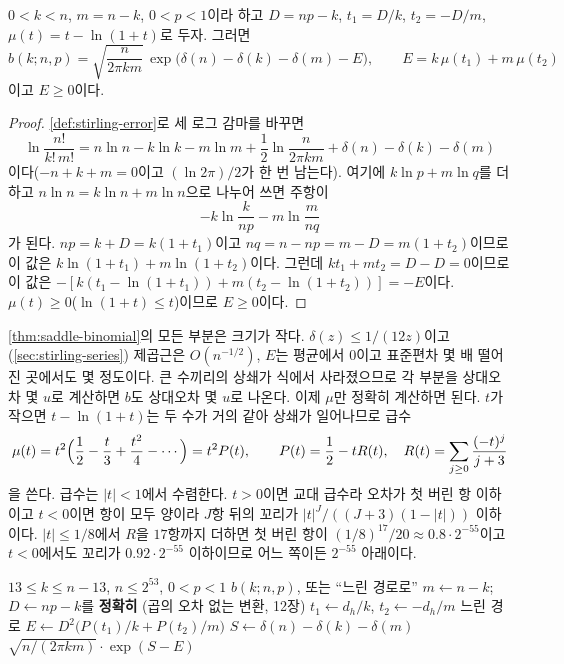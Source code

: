 \begin{theorem}[안장점 꼴]
\label{thm:saddle-binomial}
$0<k<n$, $m=n-k$, $0<p<1$이라 하고 $D=np-k$, $t_1=D/k$, $t_2=-D/m$, $\mu(t)=t-\ln(1+t)$로 두자. 그러면
\[
b(k;n,p)=\sqrt{\frac{n}{2\pi km}}\,\exp\bigl(\delta(n)-\delta(k)-\delta(m)-E\bigr),\qquad E=k\,\mu(t_1)+m\,\mu(t_2)
\]
이고 $E\ge0$이다.
\end{theorem}

\begin{proof}
\cref{def:stirling-error}로 세 로그 감마를 바꾸면
\[
\ln\frac{n!}{k!\,m!}=n\ln n-k\ln k-m\ln m+\frac12\ln\frac{n}{2\pi km}+\delta(n)-\delta(k)-\delta(m)
\]
이다($-n+k+m=0$이고 $(\ln2\pi)/2$가 한 번 남는다). 여기에 $k\ln p+m\ln q$를 더하고 $n\ln n=k\ln n+m\ln n$으로 나누어 쓰면 주항이
\[
-k\ln\frac{k}{np}-m\ln\frac{m}{nq}
\]
가 된다. $np=k+D=k(1+t_1)$이고 $nq=n-np=m-D=m(1+t_2)$이므로 이 값은 $k\ln(1+t_1)+m\ln(1+t_2)$이다. 그런데 $kt_1+mt_2=D-D=0$이므로 이 값은 $-[k(t_1-\ln(1+t_1))+m(t_2-\ln(1+t_2))]=-E$이다. $\mu(t)\ge0$($\ln(1+t)\le t$)이므로 $E\ge0$이다.
\end{proof}

\cref{thm:saddle-binomial}의 모든 부분은 크기가 작다. $\delta(z)\le1/(12z)$이고(\cref{sec:stirling-series}) 제곱근은 $O(n^{-1/2})$, $E$는 평균에서 $0$이고 표준편차 몇 배 떨어진 곳에서도 몇 정도이다. 큰 수끼리의 상쇄가 식에서 사라졌으므로 각 부분을 상대오차 몇 $u$로 계산하면 $b$도 상대오차 몇 $u$로 나온다. 이제 $\mu$만 정확히 계산하면 된다. $t$가 작으면 $t-\ln(1+t)$는 두 수가 거의 같아 상쇄가 일어나므로 급수
\[
\mu(t)=t^2\Bigl(\frac12-\frac t3+\frac{t^2}4-\cdots\Bigr)=t^2P(t),\qquad P(t)=\frac12-tR(t),\quad R(t)=\sum_{j\ge0}\frac{(-t)^j}{j+3}
\]
을 쓴다. 급수는 $|t|<1$에서 수렴한다. $t>0$이면 교대 급수라 오차가 첫 버린 항 이하이고 $t<0$이면 항이 모두 양이라 $J$항 뒤의 꼬리가 $|t|^J/((J+3)(1-|t|))$ 이하이다. $|t|\le1/8$에서 $R$을 $17$항까지 더하면 첫 버린 항이 $(1/8)^{17}/20\approx0.8\cdot2^{-55}$이고 $t<0$에서도 꼬리가 $0.92\cdot2^{-55}$ 이하이므로 어느 쪽이든 $2^{-55}$ 아래이다.

\begin{algorithm}[htbp]
\begin{algorithmic}[1]
\Require $13\le k\le n-13$, $n\le2^{53}$, $0<p<1$
\Ensure $b(k;n,p)$, 또는 ``느린 경로로''
\State $m\gets n-k$; $D\gets np-k$를 \textbf{정확히} (곱의 오차 없는 변환, 12장) 
\State $t_1\gets d_h/k$, $t_2\gets-d_h/m$
 \Return 느린 경로 
\EndIf
\State $E\gets D^2\bigl(P(t_1)/k+P(t_2)/m\bigr)$ 
\State $S\gets\delta(n)-\delta(k)-\delta(m)$ 
\State \Return $\sqrt{n/(2\pi km)}\cdot\exp(S-E)$
\end{algorithmic}
\caption{이항 확률의 안장점 꼴 (stardust 의 빠른 경로를 줄인 것)}
\label{alg:binom-saddle}
\end{algorithm}

